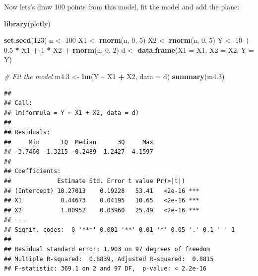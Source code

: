 \documentclass[
]{book}
\newenvironment{Shaded}{\begin{snugshade}}{\end{snugshade}}
\newcommand{\AttributeTok}[1]{\textcolor[rgb]{0.13,0.29,0.53}{#1}}
\newcommand{\CommentTok}[1]{\textcolor[rgb]{0.56,0.35,0.01}{\textit{#1}}}
\newcommand{\DecValTok}[1]{\textcolor[rgb]{0.00,0.00,0.81}{#1}}
\newcommand{\FloatTok}[1]{\textcolor[rgb]{0.00,0.00,0.81}{#1}}
\newcommand{\FunctionTok}[1]{\textcolor[rgb]{0.13,0.29,0.53}{\textbf{#1}}}
\newcommand{\NormalTok}[1]{#1}
\newcommand{\OtherTok}[1]{\textcolor[rgb]{0.56,0.35,0.01}{#1}}
\newcommand{\SpecialCharTok}[1]{\textcolor[rgb]{0.81,0.36,0.00}{\textbf{#1}}}
\begin{document}
Now lets's draw 100 points from this model, fit the model and add the plane:

\begin{Shaded}
\begin{Highlighting}[]
\FunctionTok{library}\NormalTok{(plotly)}

\FunctionTok{set.seed}\NormalTok{(}\DecValTok{123}\NormalTok{)}
\NormalTok{n }\OtherTok{\textless{}{-}} \DecValTok{100}
\NormalTok{X1 }\OtherTok{\textless{}{-}} \FunctionTok{rnorm}\NormalTok{(n, }\DecValTok{0}\NormalTok{, }\DecValTok{5}\NormalTok{)}
\NormalTok{X2 }\OtherTok{\textless{}{-}} \FunctionTok{rnorm}\NormalTok{(n, }\DecValTok{0}\NormalTok{, }\DecValTok{5}\NormalTok{)}
\NormalTok{Y }\OtherTok{\textless{}{-}} \DecValTok{10} \SpecialCharTok{+} \FloatTok{0.5} \SpecialCharTok{*}\NormalTok{ X1 }\SpecialCharTok{+} \DecValTok{1} \SpecialCharTok{*}\NormalTok{ X2 }\SpecialCharTok{+} \FunctionTok{rnorm}\NormalTok{(n, }\DecValTok{0}\NormalTok{, }\DecValTok{2}\NormalTok{)}
\NormalTok{d }\OtherTok{\textless{}{-}} \FunctionTok{data.frame}\NormalTok{(}\AttributeTok{X1 =}\NormalTok{ X1, }\AttributeTok{X2 =}\NormalTok{ X2, }\AttributeTok{Y =}\NormalTok{ Y)}

\CommentTok{\# Fit the model}
\NormalTok{m4}\FloatTok{.3} \OtherTok{\textless{}{-}} \FunctionTok{lm}\NormalTok{(Y }\SpecialCharTok{\textasciitilde{}}\NormalTok{ X1 }\SpecialCharTok{+}\NormalTok{ X2, }\AttributeTok{data =}\NormalTok{ d)}
\FunctionTok{summary}\NormalTok{(m4}\FloatTok{.3}\NormalTok{)}
\end{Highlighting}
\end{Shaded}

\begin{verbatim}
## 
## Call:
## lm(formula = Y ~ X1 + X2, data = d)
## 
## Residuals:
##     Min      1Q  Median      3Q     Max 
## -3.7460 -1.3215 -0.2489  1.2427  4.1597 
## 
## Coefficients:
##             Estimate Std. Error t value Pr(>|t|)    
## (Intercept) 10.27013    0.19228   53.41   <2e-16 ***
## X1           0.44673    0.04195   10.65   <2e-16 ***
## X2           1.00952    0.03960   25.49   <2e-16 ***
## ---
## Signif. codes:  0 '***' 0.001 '**' 0.01 '*' 0.05 '.' 0.1 ' ' 1
## 
## Residual standard error: 1.903 on 97 degrees of freedom
## Multiple R-squared:  0.8839, Adjusted R-squared:  0.8815 
## F-statistic: 369.1 on 2 and 97 DF,  p-value: < 2.2e-16
\end{verbatim}
\end{document}
